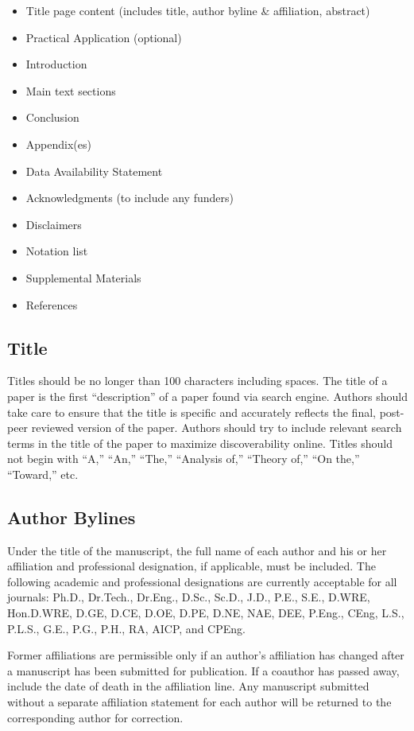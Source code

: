 \documentclass[Journal,letterpaper,NoLineNumbers]{ascelike-new}
\begin{document}
\begin{itemize}
\item Title page content (includes title, author byline \& affiliation, abstract)
\item Practical Application (optional)
\item Introduction
\item Main text sections
\item Conclusion
\item Appendix(es)
\item Data Availability Statement
\item Acknowledgments (to include any funders)
\item Disclaimers
\item Notation list
\item Supplemental Materials
\item References
\end{itemize}

\subsection{Title}

Titles should be no longer than 100 characters including spaces. The title of a paper is the first ``description'' of a paper found via search engine. Authors should take care to ensure that the title is specific and accurately reflects the final, post-peer reviewed version of the paper. Authors should try to include relevant search terms in the title of the paper to maximize discoverability online.
Titles should not begin with ``A,'' ``An,'' ``The,'' ``Analysis of,'' ``Theory of,'' ``On the,'' ``Toward,'' etc. 

\subsection{Author Bylines}

Under the title of the manuscript, the full name of each author and his or her affiliation and professional designation, if applicable, must be included. The following academic and professional designations are
currently acceptable for all journals: Ph.D., Dr.Tech., Dr.Eng., D.Sc., Sc.D., J.D., P.E., S.E., D.WRE, Hon.D.WRE, D.GE, D.CE, D.OE, D.PE, D.NE, NAE, DEE, P.Eng., CEng, L.S., P.L.S., G.E., P.G., P.H., RA, AICP, and CPEng.

Former affiliations are permissible only if an author's affiliation has changed after a manuscript has been submitted for publication. If a coauthor has passed away, include the date of death in the affiliation line. Any manuscript submitted without a separate affiliation statement for each author will be returned to the corresponding author for correction.
\end{document}

